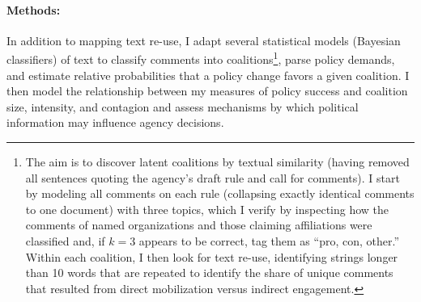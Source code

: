 \paragraph{Methods:} In addition to mapping text re-use, I adapt several statistical models (Bayesian classifiers) of text to classify comments into coalitions\footnote{
The aim is to discover latent coalitions by textual similarity (having removed all sentences quoting the agency's draft rule and call for comments). I start by modeling all comments on each rule (collapsing exactly identical comments to one document) with three topics, which I verify by inspecting how the comments of named organizations and those claiming affiliations were classified and, if $k=3$ appears to be correct, tag them as ``pro, con, other.'' Within each coalition, I then look for text re-use, identifying strings longer than 10 words that are repeated to identify the share of unique comments that resulted from direct mobilization versus indirect engagement.
}, parse policy demands, and estimate relative probabilities that a policy change favors a given coalition. I then model the relationship between my measures of policy success and coalition size, intensity, and contagion and assess mechanisms
by which political information may influence agency decisions.

